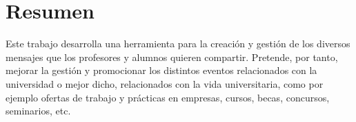 
\chapter*{Resumen}

Este trabajo desarrolla una herramienta para la creación y gestión de los diversos mensajes que los profesores y alumnos quieren compartir. Pretende, por tanto, mejorar la gestión y promocionar los distintos eventos relacionados con la universidad o mejor dicho, relacionados con la vida universitaria, como por ejemplo ofertas de trabajo y prácticas en empresas, cursos, becas, concursos, seminarios, etc.

